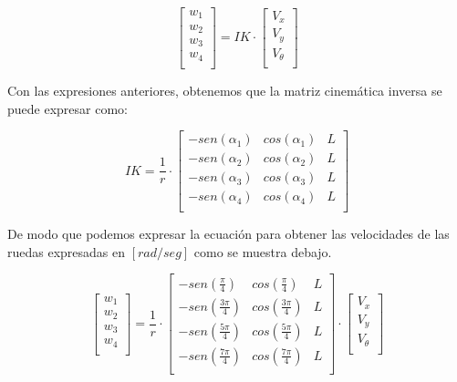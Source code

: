 $$ \begin{bmatrix} w_1 \\ w_2 \\ w_3 \\ w_4 \\ \end{bmatrix} = IK \cdot \begin{bmatrix} V_x \\ V_y \\ V_\theta \\ \end{bmatrix} $$

Con las expresiones anteriores, obtenemos que la matriz cinemática inversa se puede expresar como:

$$ IK = 
    \frac{1}{r}
    \cdot
    \begin{bmatrix}
        {-sen(\alpha_1)} & {cos(\alpha_1)} & L \\
        {-sen(\alpha_2)} & {cos(\alpha_2)} & L \\
        {-sen(\alpha_3)} & {cos(\alpha_3)} & L \\
        {-sen(\alpha_4)} & {cos(\alpha_4)} & L \\
    \end{bmatrix} $$

De modo que podemos expresar la ecuación para obtener las velocidades de las ruedas expresadas en $[rad/seg]$ como se muestra debajo.

$$ \begin{bmatrix} w_1 \\ w_2 \\ w_3 \\ w_4 \\ \end{bmatrix} = \frac{1}{r} \cdot \begin{bmatrix}
    {-sen(\frac{\pi}{4})} & {cos( \frac{\pi}{4})} & L \\
    {-sen(\frac{3\pi}{4})} & {cos(\frac{3\pi}{4})} & L \\
    {-sen(\frac{5\pi}{4})} & {cos(\frac{5\pi}{4})} & L \\
    {-sen(\frac{7\pi}{4})} & {cos(\frac{7\pi}{4})} & L \\
\end{bmatrix} \cdot
\begin{bmatrix} V_x \\ V_y \\ V_\theta \\ \end{bmatrix} $$

